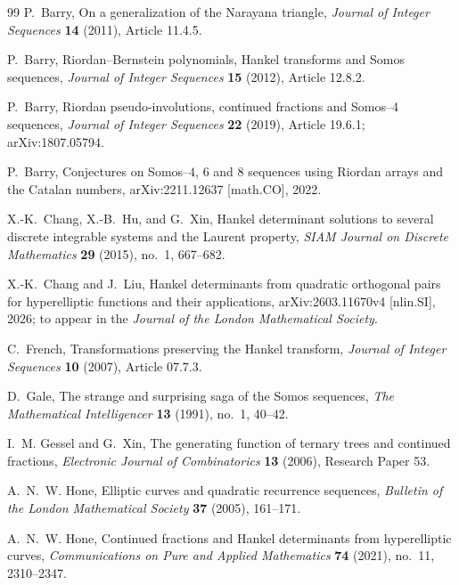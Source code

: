 \documentclass[11pt]{article}
\theoremstyle{remark}
\begin{document}
\begin{thebibliography}{99}
P.~Barry,
\newblock On a generalization of the Narayana triangle,
\newblock \emph{Journal of Integer Sequences} \textbf{14} (2011), Article 11.4.5.

P.~Barry,
\newblock Riordan--Bernstein polynomials, Hankel transforms and Somos sequences,
\newblock \emph{Journal of Integer Sequences} \textbf{15} (2012), Article 12.8.2.

P.~Barry,
\newblock Riordan pseudo-involutions, continued fractions and Somos--4 sequences,
\newblock \emph{Journal of Integer Sequences} \textbf{22} (2019), Article 19.6.1;
\newblock arXiv:1807.05794.

P.~Barry,
\newblock Conjectures on Somos--$4$, $6$ and $8$ sequences using Riordan arrays and the Catalan numbers,
\newblock arXiv:2211.12637 [math.CO], 2022.

X.-K.~Chang, X.-B.~Hu, and G.~Xin,
\newblock Hankel determinant solutions to several discrete integrable systems and the Laurent property,
\newblock \emph{SIAM Journal on Discrete Mathematics} \textbf{29} (2015), no.~1, 667--682.

X.-K.~Chang and J.~Liu,
\newblock Hankel determinants from quadratic orthogonal pairs for hyperelliptic functions and their applications,
\newblock arXiv:2603.11670v4 [nlin.SI], 2026; to appear in the \emph{Journal of the London Mathematical Society}.

C.~French,
\newblock Transformations preserving the Hankel transform,
\newblock \emph{Journal of Integer Sequences} \textbf{10} (2007), Article 07.7.3.

D.~Gale,
\newblock The strange and surprising saga of the Somos sequences,
\newblock \emph{The Mathematical Intelligencer} \textbf{13} (1991), no.~1, 40--42.

I.~M. Gessel and G.~Xin,
\newblock The generating function of ternary trees and continued fractions,
\newblock \emph{Electronic Journal of Combinatorics} \textbf{13} (2006), Research Paper 53.

A.~N.~W. Hone,
\newblock Elliptic curves and quadratic recurrence sequences,
\newblock \emph{Bulletin of the London Mathematical Society} \textbf{37} (2005), 161--171.

A.~N.~W. Hone,
\newblock Continued fractions and Hankel determinants from hyperelliptic curves,
\newblock \emph{Communications on Pure and Applied Mathematics} \textbf{74} (2021), no.~11, 2310--2347.


\end{thebibliography}
\end{document}
